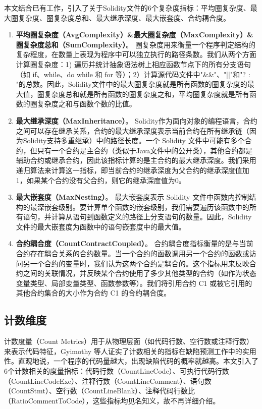 本文结合已有工作，引入了关于Solidity文件的6个复杂度指标：平均圈复杂度、最大圈复杂度、圈复杂度总和、最大继承深度、最大嵌套度、合约耦合度。
\begin{enumerate}[label=\Alph*., align=left, leftmargin=*]
    \item \textbf{平均圈复杂度（AvgComplexity）\&最大圈复杂度（MaxComplexity）\&圈复杂度总和（SumComplexity）}。
    圈复杂度用来衡量一个程序判定结构的复杂程度，在数量上表现为程序中可以独立执行的路径条数。我们从两个方面计算圈复杂度：1) 遍历并统计抽象语法树上相应函数节点下的所有分支语句（如 if、while、do while 和 for 等）；2）计算源代码文件中"\&\&"、"||"和"? : "的总数。因此，Solidity文件中的最大圈复杂度就是所有函数的圈复杂度的最大值，圈复杂度总和就是所有函数的圈复杂度之和，平均圈复杂度就是所有函数的圈复杂度之和与函数个数的比值。
    \item \textbf{最大继承深度（MaxInheritance）}。
    Solidity作为面向对象的编程语言，合约之间可以存在继承关系，合约的最大继承深度表示当前合约在所有继承链（因为Solidity支持多重继承）中的路径长度。一个 Solidity 文件中可能有多个合约，但只有一个合约是主合约（类似于Java文件中的公开类），其他合约都是辅助合约或继承合约，因此该指标计算的是主合约的最大继承深度。我们采用递归算法来计算这一指标，即当前合约的继承深度为父合约的继承深度值加1，如果某个合约没有父合约，则它的继承深度值为0。
    \item \textbf{最大嵌套度（MaxNesting）}。
    最大嵌套度表示 Solidity 文件中函数内控制结构的最深嵌套级别。要计算单个函数的嵌套级别，我们需要遍历该函数中的所有语句，并计算从语句到函数定义的路径上分支语句的数量。因此，Solidity 文件的最大嵌套度为函数中的语句嵌套度中的最大值。
    \item \textbf{合约耦合度（CountContractCoupled）}。
    合约耦合度指标衡量的是与当前合约存在耦合关系的合约数量。当一个合约的函数调用另一个合约的函数或访问另一个合约的变量时，我们认为这两个合约是耦合的。这个指标用来反映合约之间的关联情况，并反映某个合约使用了多少其他类型的合约（如作为状态变量类型、局部变量类型、函数参数等）。我们将引用合约 C1 或被它引用的其他合约集合的大小作为合约 C1 的合约耦合度。
\end{enumerate}
\subsection{计数维度}
\label{sec:计数维度}
计数度量（Count Metrics）用于从物理层面（如代码行数、空行数或注释行数）来表示代码特征，Gyimothy 等人\cite{gyimothy2005}证实了计数相关的指标在缺陷预测工作中的实用性。直观地说，一个程序的代码量越大，出现缺陷代码的概率就越高。本文引入了6个计数相关的度量指标：代码行数（CountLineCode）、可执行代码行数（CountLineCodeExe）、注释行数（CountLineComment）、语句数（CountStmt）、空行数（CountLineBlank）、注释代码行数比（RatioCommentToCode），这些指标均见名知义，故不再详细介绍。

